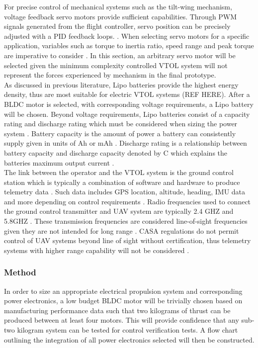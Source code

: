 For precise control of mechanical systems such as the tilt-wing mechanism, voltage feedback servo motors provide sufficient capabilities. Through PWM signals generated from the flight controller, servo position can be precisely adjusted with a PID feedback loops. \cite{van1981motor}. When selecting servo motors for a specific application, variables such as torque to inertia ratio, speed range and peak torque are imperative to consider \cite{krishnan1987selection}. In this section, an arbitrary servo motor will be selected given the minimum complexity controlled VTOL system will not represent the forces experienced by mechanism in the final prototype.\\

As discussed in previous literature, Lipo batteries provide the highest energy density, thus are most suitable for electric VTOL systems (REF HERE). After a BLDC motor is selected, with corresponding voltage requirements, a Lipo battery will be chosen. Beyond voltage requirements, Lipo batteries consist of a capacity rating and discharge rating which must be considered when sizing the power system \cite{chang2016lipo}. Battery capacity is the amount of power a battery can consistently supply given in units of Ah or mAh \cite{chuangfeng2011measurement}. Discharge rating is a relationship between battery capacity and discharge capacity denoted by C which explains the batteries maximum output current \cite{chuangfeng2011measurement}. \\

The link between the operator and the VTOL system is the ground control station which is typically a combination of software and hardware to produce telemetry data \cite{haque2017drone}. Such data includes GPS location, altitude, heading, IMU data and more depending on control requirements \cite{haque2017drone}. Radio frequencies used to connect the ground control transmitter and UAV system are typically 2.4 GHZ and 5.8GHZ \cite{Radio}. These transmission frequencies are considered line-of-sight frequencies given they are not intended for long range \cite{Radio}. CASA regulations do not permit control of UAV systems beyond line of sight without certification, thus telemetry systems with higher range capability will not be considered \cite{CASALaw}. 

\subsubsection{Method}
In order to size an appropriate electrical propulsion system and corresponding power electronics, a low budget BLDC motor will be trivially chosen based on manufacturing performance data such that two kilograms of thrust can be produced between at least four motors. This will provide confidence that any sub-two kilogram system can be tested for control verification tests. A flow chart outlining the integration of all power electronics selected will then be constructed. 
